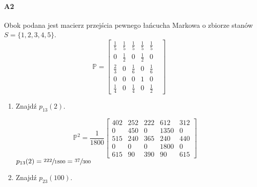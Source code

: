 \paragraph{A2} Obok podana jest macierz przejścia pewnego łańcucha Markowa o zbiorze stanów $S = \{1, 2, 3, 4, 5\}$.
$$\mathbb{P}=\begin{bmatrix}
\frac{1}{5}&\frac{1}{5}&\frac{1}{5}&\frac{1}{5}&\frac{1}{5}&\\
0&\frac{1}{2}&0&\frac{1}{2}&0\\
\frac{2}{3}&0&\frac{1}{6}&0&\frac{1}{6}&\\
0&0&0&1&0\\
\frac{1}{4}&0&\frac{1}{4}&0&\frac{1}{2}&
\end{bmatrix}$$
\begin{enumerate}[label=\alph*)]
\item Znajdź $p_{13}(2)$.

$$\mathbb{P}^2= \frac{1}{1800}\begin{bmatrix}
402 & 252 & 222 & 612 & 312\\
0 & 450 & 0 & 1350 & 0\\
515 & 240 & 365 & 240 & 440\\
0 & 0 & 0 & 1800 & 0\\
615 & 90 & 390 & 90 & 615
\end{bmatrix}$$
$p_{13}(2)=\sfrac{222}{1800}=\sfrac{37}{300}$
\item Znajdź $p_{23}(100)$.


\end{enumerate}
